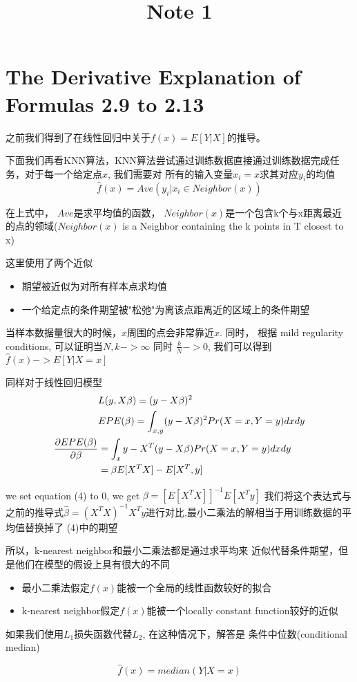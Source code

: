 \documentclass[ruled]{article}
\begin{document}
\title{Note 1}


\section{The Derivative Explanation of Formulas 2.9 to 2.13}
之前我们得到了在线性回归中关于$f(x) = E[Y|X]$的推导。

下面我们再看KNN算法，KNN算法尝试通过训练数据直接通过训练数据完成任务，对于每一个给定点$x$, 我们需要对
所有的输入变量$x_i = x$求其对应$y_i$的均值
\begin{equation}
    \hat{f}(x) = Ave(y_i | x_i \in Neighbor(x))
\end{equation}

在上式中， $Ave$是求平均值的函数， $Neighbor(x)$是一个包含k个与x距离最近
的点的领域($Neighbor(x)$ is a Neighbor containing the k points
in T closest to x)

这里使用了两个近似
\begin{itemize}
    \item 期望被近似为对所有样本点求均值
    \item 一个给定点的条件期望被"松弛"为离该点距离近的区域上的条件期望
\end{itemize}

当样本数据量很大的时候，$x$周围的点会非常靠近$x$.
同时， 根据 mild regularity conditions, 可以证明当$N,k -> \infty$
同时 $\frac{k}{N} -> 0$, 我们可以得到$\hat{f}(x) -> E[Y|X=x]$

同样对于线性回归模型
\begin{align}
    &L(y, X \beta) = (y - X \beta) ^ 2  
    \\ &EPE(\beta) = \int_{x, y} (y - X\beta) ^ 2 
    Pr(X = x, Y = y) dx dy 
    \\ \frac{\partial{EPE(\beta)}}{\partial{\beta}} &= 
    \int_{x}{y} -X^T (y - X \beta) Pr(X = x, Y = y)
    dx dy \notag \\ 
    &=\beta E[X^TX] - E[X^T, y]
\end{align}

we set equation (4) to 0, we get $\beta = [E[X^T X]]^{-1} E[X^T y]$
我们将这个表达式与之前的推导式$\hat{\beta} = (X^T X) ^ {-1} 
X^T y$进行对比,最小二乘法的解相当于用训练数据的平均值替换掉了
(4)中的期望

    所以，k-nearest neighbor和最小二乘法都是通过求平均来
近似代替条件期望，但是他们在模型的假设上具有很大的不同
\begin{itemize}
  \item 最小二乘法假定$f(x)$能被一个全局的线性函数较好的拟合
  \item k-nearest neighbor假定$f(x)$能被一个locally 
  constant function较好的近似
\end{itemize}

如果我们使用$L_1$损失函数代替$L_2$, 在这种情况下，解答是
条件中位数(conditional median)

\begin{equation}
  \hat{f}(x) = median(Y|X=x) 
\end{equation}
\end{document}
